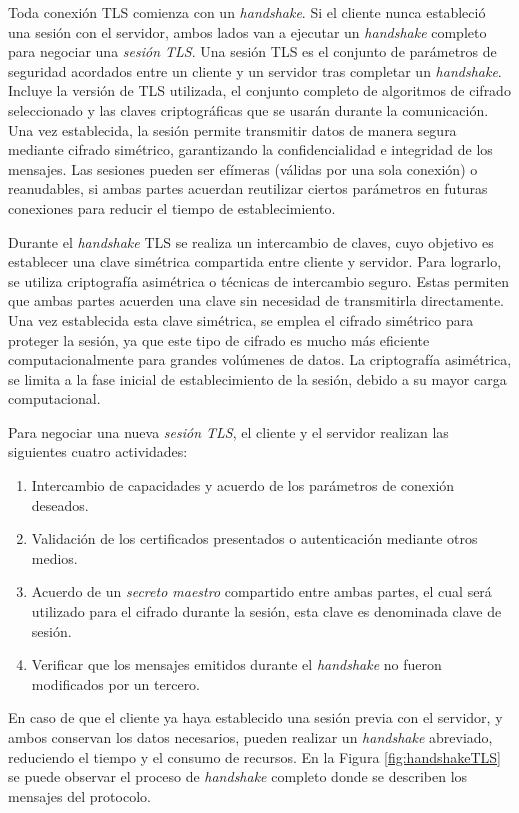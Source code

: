 Toda conexión TLS comienza con un \textit{handshake}. Si el cliente nunca estableció una sesión con el servidor, ambos lados van a ejecutar un \textit{handshake} completo para negociar una \textit{sesión TLS}. Una sesión TLS es el conjunto de parámetros de seguridad acordados entre un cliente y un servidor tras completar un \textit{handshake}. Incluye la versión de TLS utilizada, el conjunto completo de algoritmos de cifrado seleccionado y las claves criptográficas que se usarán durante la comunicación. Una vez establecida, la sesión permite transmitir datos de manera segura mediante cifrado simétrico, garantizando la confidencialidad e integridad de los mensajes. Las sesiones pueden ser efímeras (válidas por una sola conexión) o reanudables, si ambas partes acuerdan reutilizar ciertos parámetros en futuras conexiones para reducir el tiempo de establecimiento.

Durante el \textit{handshake} TLS se realiza un intercambio de claves, cuyo objetivo es establecer una clave simétrica compartida entre cliente y servidor. Para lograrlo, se utiliza criptografía asimétrica o técnicas de intercambio seguro. Estas permiten que ambas partes acuerden una clave sin necesidad de transmitirla directamente. Una vez establecida esta clave simétrica, se emplea el cifrado simétrico para proteger la sesión, ya que este tipo de cifrado es mucho más eficiente computacionalmente para grandes volúmenes de datos. La criptografía asimétrica, se limita a la fase inicial de establecimiento de la sesión, debido a su mayor carga computacional.

Para negociar una nueva \textit{sesión TLS}, el cliente y el servidor realizan las siguientes cuatro actividades:

\begin{enumerate}
    \item Intercambio de capacidades y acuerdo de los parámetros de conexión deseados.
    \item Validación de los certificados presentados o autenticación mediante otros medios.
    \item Acuerdo de un \textit{secreto maestro} compartido entre ambas partes, el cual será utilizado para el cifrado durante la sesión, esta clave es denominada clave de sesión.
    \item Verificar que los mensajes emitidos durante el \textit{handshake} no fueron modificados por un tercero.
\end{enumerate}

En caso de que el cliente ya haya establecido una sesión previa con el servidor, y ambos conservan los datos necesarios, pueden realizar un \textit{handshake} abreviado, reduciendo el tiempo y el consumo de recursos. En la Figura \ref{fig:handshakeTLS} se puede observar el proceso de \textit{handshake} completo donde se describen los mensajes del protocolo.

